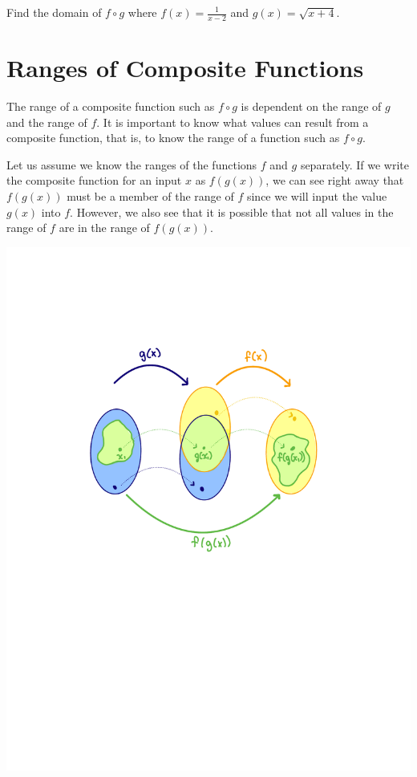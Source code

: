 \documentclass{ximera}
\begin{document}
\begin{exploration}
Find the domain of $f \circ g$ where $f(x)=\frac{1}{x-2}$ and $g(x)=\sqrt{x+4}$.
\end{exploration}





\section{Ranges of Composite Functions}
The range of a composite function such as $f \circ g$ is dependent on the range of $g$ and the range of $f$. It is important to know what values can result from a composite function, that is, to know the range of a function such as $f  \circ g$. 

Let us assume we know the ranges of the functions $f$ and $g$ separately. If we write the composite function for an input $x$ as $f(g(x))$, we can see right away that $f(g(x))$ must be a member of the range of $f$ since we will input the value $g(x)$ into $f$. However, we also see that it is possible that not all values in the range of $f$ are in the range of $f(g(x))$.  

\begin{image}
\includegraphics{CompDom1.pdf}
\end{image}
\end{document}
